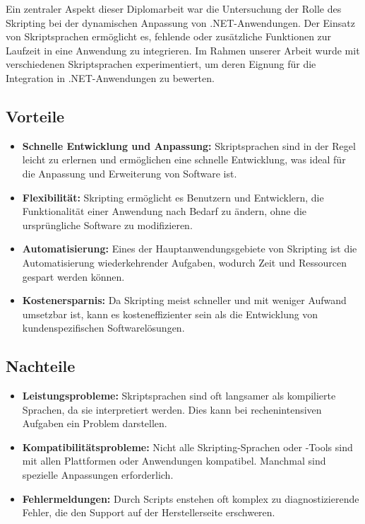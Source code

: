 Ein zentraler Aspekt dieser Diplomarbeit war die Untersuchung der Rolle des Skripting 
bei der dynamischen Anpassung von .NET-Anwendungen. Der Einsatz von Skriptsprachen ermöglicht es, 
fehlende oder zusätzliche Funktionen zur Laufzeit in eine Anwendung zu integrieren. 
Im Rahmen unserer Arbeit wurde mit verschiedenen Skriptsprachen experimentiert, um deren 
Eignung für die Integration in .NET-Anwendungen zu bewerten.

\subsection*{Vorteile}

\begin{itemize}
    \item \textbf{Schnelle Entwicklung und Anpassung:} Skriptsprachen sind in der Regel 
    leicht zu erlernen und ermöglichen eine schnelle Entwicklung, was ideal für die 
    Anpassung und Erweiterung von Software ist.
    \item \textbf{Flexibilität:} Skripting ermöglicht es Benutzern und Entwicklern, 
    die Funktionalität einer Anwendung nach Bedarf zu ändern, ohne die ursprüngliche 
    Software zu modifizieren.
    \item \textbf{Automatisierung:} Eines der Hauptanwendungsgebiete von Skripting ist 
    die Automatisierung wiederkehrender Aufgaben, wodurch Zeit und Ressourcen 
    gespart werden können.
    \item \textbf{Kostenersparnis:} Da Skripting meist schneller und mit weniger 
    Aufwand umsetzbar ist, kann es kosteneffizienter sein als die Entwicklung von 
    kundenspezifischen Softwarelösungen.
\end{itemize}

\subsection*{Nachteile}

\begin{itemize}
    \item \textbf{Leistungsprobleme:} Skriptsprachen sind oft langsamer als kompilierte Sprachen, 
    da sie interpretiert werden. Dies kann bei rechenintensiven Aufgaben ein Problem darstellen.
    \item \textbf{Kompatibilitätsprobleme:} Nicht alle Skripting-Sprachen oder -Tools sind 
    mit allen Plattformen oder Anwendungen kompatibel. Manchmal sind spezielle 
    Anpassungen erforderlich.
    \item \textbf{Fehlermeldungen:} Durch Scripts enstehen oft komplex zu diagnostizierende Fehler,
    die den Support auf der Herstellerseite erschweren.
\end{itemize}

